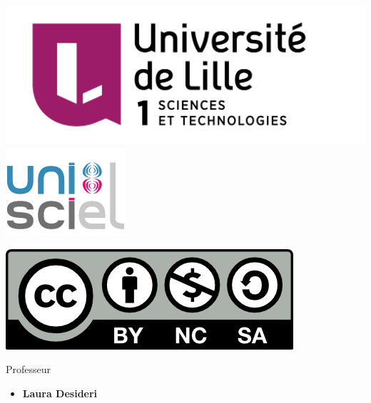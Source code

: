 

 




\begin{frame}

\thispagestyle{empty}    

  \hspace*{-20ex}
  \begin{minipage}{0.35\textwidth}
  \begin{center}
    \vspace*{5ex}   


    \bigskip

    \includegraphics[scale=0.13]{../divers/Logo-Univ-Lille-1-new.png}
    \quad
    \includegraphics[scale=0.3]{../divers/logo-unisciel.png}

    \vspace*{5ex}

    \includegraphics[scale=0.5]{../divers/by-nc-sa.png}
  \end{center}
  \end{minipage}
  \hfil
  \begin{minipage}{0.90\textwidth}
  \footnotesize
   \vspace*{2ex}
  Professeur
  \begin{itemize}
    \item {\bf Laura Desideri}  
  \end{itemize} 
  

\end{minipage}
\end{frame}
